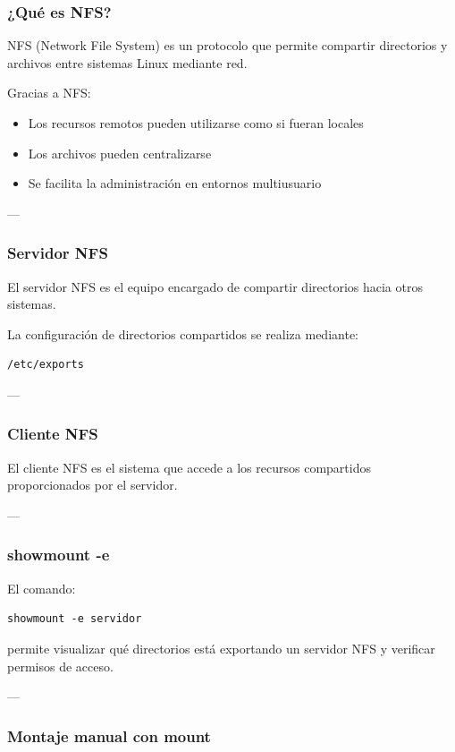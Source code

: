 \documentclass[11pt, letterpaper]{article}
\begin{document}
\subsubsection{¿Qué es NFS?}
\label{sec:org507ef47}

NFS (Network File System) es un protocolo que permite compartir directorios y archivos entre sistemas Linux mediante red.

Gracias a NFS:

\begin{itemize}
\item Los recursos remotos pueden utilizarse como si fueran locales
\item Los archivos pueden centralizarse
\item Se facilita la administración en entornos multiusuario
\end{itemize}

---
\subsubsection{Servidor NFS}
\label{sec:org691ae16}

El servidor NFS es el equipo encargado de compartir directorios hacia otros sistemas.

La configuración de directorios compartidos se realiza mediante:

\begin{verbatim}
/etc/exports
\end{verbatim}

---
\subsubsection{Cliente NFS}
\label{sec:org45021aa}

El cliente NFS es el sistema que accede a los recursos compartidos proporcionados por el servidor.

---
\subsubsection{showmount -e}
\label{sec:org8e5f362}

El comando:

\begin{verbatim}
showmount -e servidor
\end{verbatim}

permite visualizar qué directorios está exportando un servidor NFS y verificar permisos de acceso.

---
\subsubsection{Montaje manual con mount}
\label{sec:org8b7769c}
\end{document}
